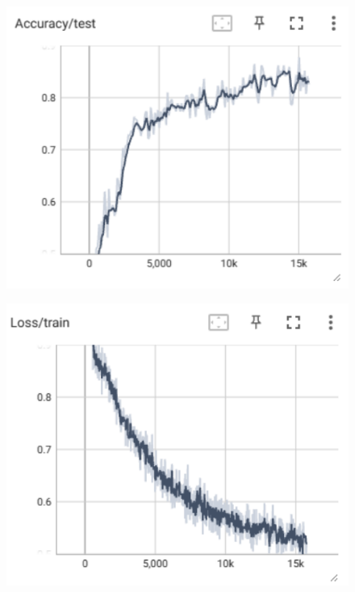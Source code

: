 \documentclass[12pt]{article}
\begin{document}
\begin{enumerate}[label=\alph*]
\begin{figure}[htbp]
	\centering
	\begin{minipage}{0.4\linewidth}
		\centering
		\includegraphics[width=0.9\linewidth]{./figures/3w1s256_acc.png}
		\label{pic one}%
	\end{minipage}
	\begin{minipage}{0.4\linewidth}
		\centering
		\includegraphics[width=0.9\linewidth]{./figures/3w1s256_train_loss.png}
		\label{pic two}%
	\end{minipage}
	\begin{minipage}{0.4\linewidth}
		\centering

\end{minipage}
\end{figure}
\end{enumerate}
\end{document}
